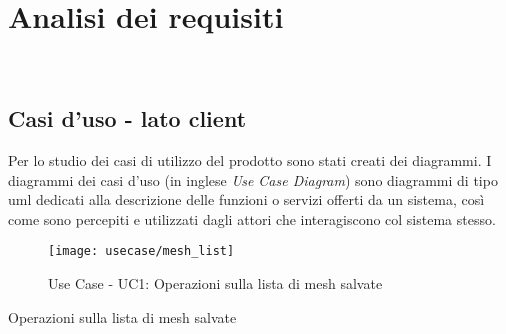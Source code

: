 
\chapter{Analisi dei requisiti}
\label{cap:analisi-requisiti}

\intro{}\\

\section{Casi d'uso - lato client}

Per lo studio dei casi di utilizzo del prodotto sono stati creati dei diagrammi.
I diagrammi dei casi d'uso (in inglese \emph{Use Case Diagram}) sono diagrammi di tipo \gls{uml} dedicati alla descrizione delle funzioni o servizi offerti da un sistema, così come sono percepiti e utilizzati dagli attori che interagiscono col sistema stesso.

\begin{figure}[!h] 
    \centering 
    \texttt{[image: usecase/mesh\_list]} 
    \caption{Use Case - UC1: Operazioni sulla lista di mesh salvate}
\end{figure}

\begin{usecase}{1}{Operazioni sulla lista di mesh salvate}
\\ 
\\ 
\\ 
\label{uc:lista-mesh}
\end{usecase}

